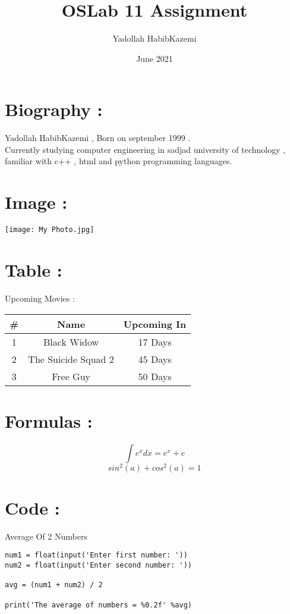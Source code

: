 \documentclass{article}
\title{OSLab 11 Assignment}
\author{Yadollah HabibKazemi}
\date{June 2021}
\begin{document}
\maketitle
\section{Biography :}

Yadollah HabibKazemi , Born on september 1999 .\\
Currently studying computer engineering in sadjad university of technology , familiar with c++ , html and python programming languages.
\section{Image :}
\begin{center}
\texttt{[image: My Photo.jpg]}    
\end{center}

\section{Table :}
\begin{table}[h]
    \centering
    Upcoming Movies : \\
    \begin{tabular}{|c|c|c|}
    \hline
    \textbf{#}&\textbf{Name}&\textbf{Upcoming In}\\
    \hline 1 & Black Widow & 17 Days \\
    \hline 2 & The Suicide Squad 2 & 45 Days \\
    \hline 3 & Free Guy & 50 Days \\
    \hline
    \end{tabular}
\end{table}

\section{Formulas :}
\[\int e^{x}dx = e^{x}+c\]
\[ sin^2(a) + cos^2(a) = 1 \]

\section{Code :}
Average Of 2 Numbers
\begin{lstlisting}
num1 = float(input('Enter first number: '))
num2 = float(input('Enter second number: '))

avg = (num1 + num2) / 2

print('The average of numbers = %0.2f' %avg)
\end{lstlisting}
\end{document}
